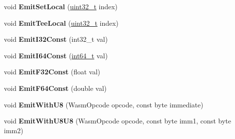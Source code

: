 \begin{DoxyCompactItemize}
\item 
\mbox{\label{classv8_1_1internal_1_1wasm_1_1WasmFunctionBuilder_a99c975f6dd584e2b09757f424dbf3785}} 
void {\bfseries Emit\+Set\+Local} (\mbox{\hyperlink{classuint32__t}{uint32\+\_\+t}} index)
\item 
\mbox{\label{classv8_1_1internal_1_1wasm_1_1WasmFunctionBuilder_a0826e12aa573c1022ef5ad677233ff39}} 
void {\bfseries Emit\+Tee\+Local} (\mbox{\hyperlink{classuint32__t}{uint32\+\_\+t}} index)
\item 
\mbox{\label{classv8_1_1internal_1_1wasm_1_1WasmFunctionBuilder_acf4a6a63c931c0a63921d7c8da1c8791}} 
void {\bfseries Emit\+I32\+Const} (int32\+\_\+t val)
\item 
\mbox{\label{classv8_1_1internal_1_1wasm_1_1WasmFunctionBuilder_ab2263176996887f0d36e0cf8b46cb527}} 
void {\bfseries Emit\+I64\+Const} (\mbox{\hyperlink{classint64__t}{int64\+\_\+t}} val)
\item 
\mbox{\label{classv8_1_1internal_1_1wasm_1_1WasmFunctionBuilder_a3fe7c1f81b67a9431752e3d7812d61b8}} 
void {\bfseries Emit\+F32\+Const} (float val)
\item 
\mbox{\label{classv8_1_1internal_1_1wasm_1_1WasmFunctionBuilder_a355be8c781159c09c0cc96e15948a947}} 
void {\bfseries Emit\+F64\+Const} (double val)
\item 
\mbox{\label{classv8_1_1internal_1_1wasm_1_1WasmFunctionBuilder_ab3a596820cd388c8ecc3a9ec9bfa4743}} 
void {\bfseries Emit\+With\+U8} (Wasm\+Opcode opcode, const byte immediate)
\item 
\mbox{\label{classv8_1_1internal_1_1wasm_1_1WasmFunctionBuilder_a7a40a246b07ac2317a5d20d07c50c501}} 
void {\bfseries Emit\+With\+U8\+U8} (Wasm\+Opcode opcode, const byte imm1, const byte imm2)
\item 
\mbox{\label{classv8_1_1internal_1_1wasm_1_1WasmFunctionBuilder_a5f73518478b32b514c1e2d221cfb67d3}} 

\end{DoxyCompactItemize}
